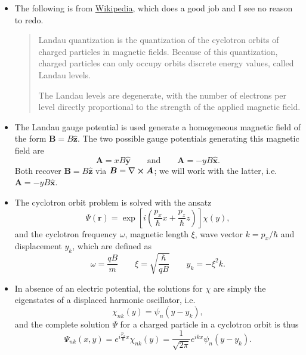 \documentclass[11pt, a4paper]{article}
\renewcommand{\curl}{\nabla \cross}
\newcommand{\eqtext}[1]{\qquad \text{#1} \qquad}
\renewcommand{\vec}[1]{\bm{#1}}  %
\newcommand{\uvec}[1]{\hat{\vec{#1}}}  %
\renewcommand{\r}{\vec{r}}  %
\newcommand{\A}{\vec{A}}  %
\newcommand{\B}{\vec{B}}  %
\renewcommand{\P}{\Psi}  %
\begin{document}
\begin{itemize}

    \item The following is from \href{https://en.wikipedia.org/wiki/Landau\_quantization}{\underline{Wikipedia}}, which does a good job and I see no reason to redo.
    \begin{quote}
        Landau quantization is the quantization of the cyclotron orbits of charged particles in magnetic fields. Because of this quantization, charged particles can only occupy orbits discrete energy values, called Landau levels. 

        The Landau levels are degenerate, with the number of electrons per level directly proportional to the strength of the applied magnetic field. 
    \end{quote}

    	\item The Landau gauge potential is used generate a homogeneous magnetic field of the form $ \B = B \uvec{z} $. The two possible gauge potentials generating this magnetic field are
	\begin{equation*}
		\A = x B \uvec{y} \eqtext{and} \A = - y B \uvec{x}.
	\end{equation*}
	Both recover $ \B = B \uvec{z} $ via $ \B = \curl \A $; we will work with the latter, i.e. $ \A = - y B \uvec{x} $.

    \item The cyclotron orbit problem is solved with the ansatz
    \begin{equation*}
		\P(\r) = \exp\left[i \left(\frac{p_{x}}{\hbar}x + \frac{p_{z}}{\hbar}z \right)\right]\chi(y),
    \end{equation*}
    and the cyclotron frequency $ \omega $, magnetic length $ \xi $, wave vector $ k = p_{x}/\hbar $ and displacement $ y_{k} $, which are defined as
    \begin{equation*}
        \omega = \frac{q B}{m} \qquad \xi = \sqrt{\frac{\hbar}{qB}} \qquad y_{k} = - \xi^{2}k.
    \end{equation*}

	\item In absence of an electric potential, the solutions for $ \chi $ are simply the eigenstates of a displaced harmonic oscillator, i.e.
	\begin{equation*}
		\chi_{nk}(y) = \psi_{n}(y - y_{k}),
	\end{equation*}
	and the complete solution $ \Psi $ for a charged particle in a cyclotron orbit is thus
	\begin{equation*}
		\P_{nk}(x, y) = e^{i\frac{p_{x}}{\hbar}x}\chi_{nk}(y) = \frac{1}{\sqrt{2\pi}}e^{ikx} \psi_{n}(y - y_{k}).
	\end{equation*}


\end{itemize}
\end{document}
